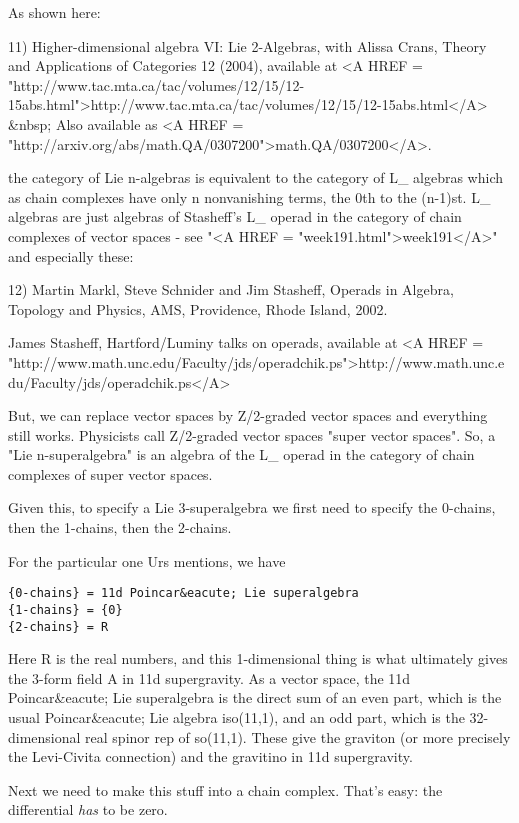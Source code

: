 As shown here:

11) Higher-dimensional algebra VI: Lie 2-Algebras, with Alissa
Crans, Theory and Applications of Categories 12 (2004),
available at <A HREF = "http://www.tac.mta.ca/tac/volumes/12/15/12-15abs.html">http://www.tac.mta.ca/tac/volumes/12/15/12-15abs.html</A> &nbsp;
Also available as <A HREF = "http://arxiv.org/abs/math.QA/0307200">math.QA/0307200</A>.

the category of Lie n-algebras is equivalent to the category
of L_{\infty } algebras which as chain complexes have only n
nonvanishing terms, the 0th to the (n-1)st.  L_{\infty } algebras
are just algebras of Stasheff's L_{\infty } operad in the category
of chain complexes of vector spaces - see "<A HREF = "week191.html">week191</A>"
and especially these:

12) Martin Markl, Steve Schnider and Jim Stasheff, Operads in Algebra,
Topology and Physics, AMS, Providence, Rhode Island, 2002.

James Stasheff, Hartford/Luminy talks on operads, available at 
<A HREF = "http://www.math.unc.edu/Faculty/jds/operadchik.ps">http://www.math.unc.edu/Faculty/jds/operadchik.ps</A>

But, we can replace vector spaces by Z/2-graded vector spaces and
everything still works.  Physicists call Z/2-graded vector spaces
"super vector spaces".  So, a "Lie n-superalgebra"
is an algebra of the L_{\infty } operad in the category of
chain complexes of super vector spaces.

Given this, to specify a Lie 3-superalgebra we first need to
specify the 0-chains, then the 1-chains, then the 2-chains.  

For the particular one Urs mentions, we have

\begin{verbatim}
{0-chains} = 11d Poincar&eacute; Lie superalgebra
{1-chains} = {0}
{2-chains} = R
\end{verbatim}
    

Here R is the real numbers, and this 1-dimensional thing is 
what ultimately gives the 3-form field A in 11d supergravity.   
As a vector space, the 11d Poincar&eacute; Lie superalgebra is the 
direct sum of an even part, which is the usual Poincar&eacute; Lie 
algebra iso(11,1), and an odd part, which is the 32-dimensional 
real spinor rep of so(11,1).  These give the graviton (or
more precisely the Levi-Civita connection) and the gravitino
in 11d supergravity.  

Next we need to make this stuff into a chain complex.  That's
easy: the differential \emph{has} to be zero.

